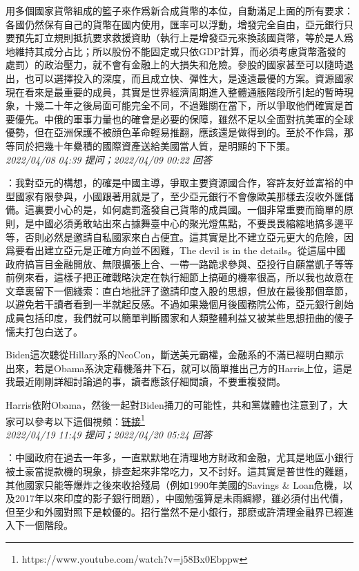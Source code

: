 \documentclass[twocolumn]{ctexart}
\begin{document}
用多個國家貨幣組成的籃子來作爲新合成貨幣的本位，自動滿足上面的所有要求：各國仍然保有自己的貨幣在國内使用，匯率可以浮動，增發完全自由，亞元銀行只要預先訂立規則抵抗要求救援資助（執行上是增發亞元來換該國貨幣，等於是人爲地維持其成分占比；所以股份不能固定或只依GDP計算，而必須考慮貨幣濫發的處罰）的政治壓力，就不會有金融上的大損失和危險。參股的國家甚至可以隨時退出，也可以選擇投入的深度，而且成立快、彈性大，是遠遠最優的方案。資源國家現在看來是最重要的成員，其實是世界經濟周期進入整體通脹階段所引起的暫時現象，十幾二十年之後局面可能完全不同，不過難關在當下，所以爭取他們確實是首要優先。中俄的軍事力量也的確會是必要的保障，雖然不足以全面對抗美軍的全球優勢，但在亞洲保護不被顔色革命輕易推翻，應該還是做得到的。至於不作爲，那等同於把幾十年纍積的國際資產送給美國當人質，是明顯的下下策。
\\

\textit{\hfill\noindent\small 2022/04/08 04:39 提问；2022/04/09 00:22 回答}

：我對亞元的構想，的確是中國主導，爭取主要資源國合作，容許友好並富裕的中型國家有限參與，小國跟著用就是了，至少亞元銀行不會像歐美那樣去沒收外匯儲備。這裏要小心的是，如何處罰濫發自己貨幣的成員國。一個非常重要而簡單的原則，是中國必須勇敢站出來占據舞臺中心的聚光燈焦點，不要畏畏縮縮地搞多邊平等，否則必然是邀請自私國家來白占便宜。這其實是比不建立亞元更大的危險，因爲要看出建立亞元是正確方向並不困難，The devil is in the details。從這届中國政府搞盲目金融開放、無限擴張上合、一帶一路跪求參與、亞投行自願當凱子等等前例來看，這樣子把正確戰略決定在執行細節上搞砸的機率很高，所以我也故意在文章裏留下一個綫索：直白地批評了邀請印度入股的思想，但放在最後那個章節，以避免若干讀者看到一半就起反感。不過如果幾個月後國務院公佈，亞元銀行創始成員包括印度，我們就可以簡單判斷國家和人類整體利益又被某些思想扭曲的傻子懦夫打包白送了。

Biden這次聽從Hillary系的NeoCon，斷送美元霸權，金融系的不滿已經明白顯示出來，若是Obama系決定藉機落井下石，就可以簡單推出己方的Harris上位，這是我最近剛剛詳細討論過的事，讀者應該仔細閲讀，不要重複發問。


Harris依附Obama，然後一起對Biden捅刀的可能性，共和黨媒體也注意到了，大家可以參考以下這個視頻：\href{https://www.youtube.com/watch?v=j58Bx0Ebppw}{链接\footnote{\url{https://www.youtube.com/watch?v=j58Bx0Ebppw}}}
\\

\textit{\hfill\noindent\small 2022/04/19 11:49 提问；2022/04/20 05:24 回答}

：中國政府在過去一年多，一直默默地在清理地方財政和金融，尤其是地區小銀行被土豪當提款機的現象，排查起來非常吃力，又不討好。這其實是普世性的難題，其他國家只能等爆炸之後來收拾殘局（例如1990年美國的Savings \& Loan危機，以及2017年以來印度的影子銀行問題），中國勉强算是未雨綢繆，雖必須付出代價，但至少和外國對照下是較優的。招行當然不是小銀行，那麽或許清理金融界已經進入下一個階段。
\end{document}
